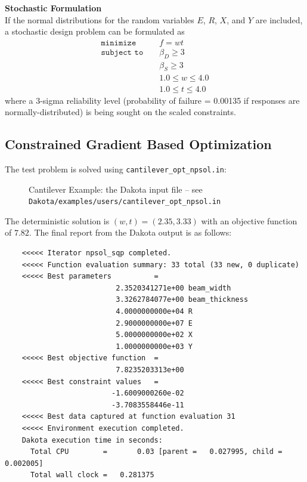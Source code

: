 {\bf Stochastic Formulation } \\
If the normal distributions for the random variables $E$, $R$, $X$,
and $Y$ are included, a stochastic design problem can be formulated as
\begin{eqnarray}
\texttt{minimize }   & & f = w t            \nonumber\\
\texttt{subject to } & & \beta_{D} \geq 3   \label{additional:cantouu}\\
                     & & \beta_{S} \geq 3   \nonumber\\
                     & & 1.0 \leq w \leq 4.0\nonumber\\
                     & & 1.0 \leq t \leq 4.0\nonumber
\end{eqnarray}
where a 3-sigma reliability level (probability of failure = 0.00135 if
responses are normally-distributed) is being sought on the scaled
constraints.

\subsection{Constrained Gradient Based Optimization}
The test problem is solved using {\tt cantilever\_opt\_npsol.in}:
\begin{figure}[ht!]
  \centering
  \begin{small}
    \begin{bigbox}
    \end{bigbox}
  \end{small}
  \caption{Cantilever Example: the Dakota input file --
see \texttt{Dakota/examples/users/cantilever\_opt\_npsol.in} }
  \label{additional:cant_opt_npsol}
\end{figure}

The deterministic solution is $(w,t)=(2.35,3.33)$ with an objective
function of $7.82$. The final report from the Dakota output is as
follows:
\begin{small}
\begin{verbatim}
    <<<<< Iterator npsol_sqp completed.
    <<<<< Function evaluation summary: 33 total (33 new, 0 duplicate)
    <<<<< Best parameters          =
                          2.3520341271e+00 beam_width
                          3.3262784077e+00 beam_thickness
                          4.0000000000e+04 R
                          2.9000000000e+07 E
                          5.0000000000e+02 X
                          1.0000000000e+03 Y
    <<<<< Best objective function  =
                          7.8235203313e+00
    <<<<< Best constraint values   =
                         -1.6009000260e-02
                         -3.7083558446e-11
    <<<<< Best data captured at function evaluation 31
    <<<<< Environment execution completed.
    Dakota execution time in seconds:
      Total CPU        =       0.03 [parent =   0.027995, child =   0.002005]
      Total wall clock =   0.281375
\end{verbatim}
\end{small}

